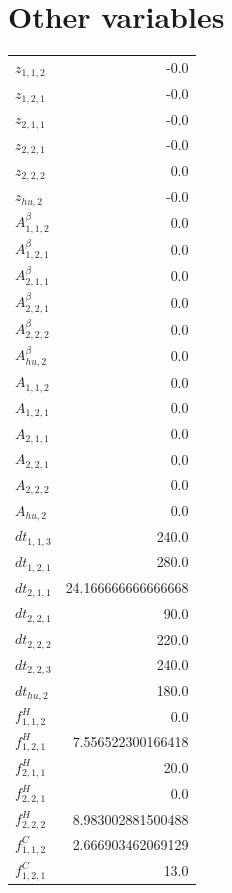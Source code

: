\documentclass{article}%
\makeatletter
\let\mcnewpage=\newpage%
\newcommand{\TrickSupertabularIntoMulticols}{%
\renewcommand\newpage{%
\if@firstcolumn%
\hrule width\linewidth height0pt%
\columnbreak%
\else%
\mcnewpage%
\fi%
}%
}%
\makeatother
\begin{document}
\section{Other variables}%
\thispagestyle{plain}%
\begin{multicols*}{3}%
\TrickSupertabularIntoMulticols%
%
\begin{supertabular}{lr}%
	$z_{1,1,2}$ & -0.0 \\%
	$z_{1,2,1}$ & -0.0 \\%
	$z_{2,1,1}$ & -0.0 \\%
	$z_{2,2,1}$ & -0.0 \\%
	$z_{2,2,2}$ & 0.0 \\%
	$z_{hu,2}$ & -0.0 \\%
	$A_{1,1,2}^{\beta}$ & 0.0 \\%
	$A_{1,2,1}^{\beta}$ & 0.0 \\%
	$A_{2,1,1}^{\beta}$ & 0.0 \\%
	$A_{2,2,1}^{\beta}$ & 0.0 \\%
	$A_{2,2,2}^{\beta}$ & 0.0 \\%
	$A_{hu,2}^{\beta}$ & 0.0 \\%
	$A_{1,1,2}$ & 0.0 \\%
	$A_{1,2,1}$ & 0.0 \\%
	$A_{2,1,1}$ & 0.0 \\%
	$A_{2,2,1}$ & 0.0 \\%
	$A_{2,2,2}$ & 0.0 \\%
	$A_{hu,2}$ & 0.0 \\%
	$dt_{1,1,3}$ & 240.0 \\%
	$dt_{1,2,1}$ & 280.0 \\%
	$dt_{2,1,1}$ & 24.166666666666668 \\%
	$dt_{2,2,1}$ & 90.0 \\%
	$dt_{2,2,2}$ & 220.0 \\%
	$dt_{2,2,3}$ & 240.0 \\%
	$dt_{hu,2}$ & 180.0 \\%
	$f_{1,1,2}^{H}$ & 0.0 \\%
	$f_{1,2,1}^{H}$ & 7.556522300166418 \\%
	$f_{2,1,1}^{H}$ & 20.0 \\%
	$f_{2,2,1}^{H}$ & 0.0 \\%
	$f_{2,2,2}^{H}$ & 8.983002881500488 \\%
	$f_{1,1,2}^{C}$ & 2.666903462069129 \\%
	$f_{1,2,1}^{C}$ & 13.0 \\%

\end{supertabular}
\end{multicols*}
\end{document}
